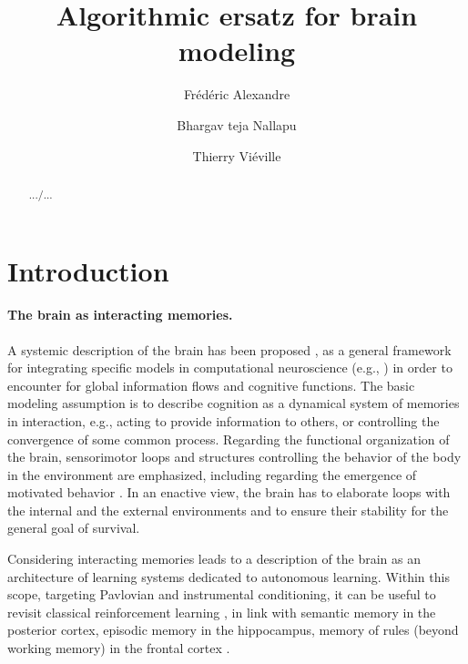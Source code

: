 \documentclass[a4,12pt]{article}
\newif\ifRR
\begin{document}
\ifRR
\makeRR 
\else
\title{Algorithmic ersatz for brain modeling}
\author[1]{Fr\'ed\'eric Alexandre}
\author[1]{Bhargav teja Nallapu}
\author[1]{Thierry Vi\'eville}
\maketitle
\begin{abstract}.../...\end{abstract}
\fi

\iffalse

\section{Introduction}

\paragraph{The brain as interacting memories.}

A systemic description of the brain has been proposed \cite{alexandre:hal-01246653}, as a general framework for integrating specific models in computational neuroscience (e.g., \cite{gershman2010context,koechlin2007information,balleine2006parallel,carrere:hal-01145790}) in order to encounter for global information flows and cognitive functions. The basic modeling assumption is to describe cognition as a dynamical system of memories in interaction, e.g., acting to provide information to others, or controlling the convergence of some common process. Regarding the functional organization of the brain, sensorimotor loops and structures controlling the behavior of the body in the environment are emphasized, including regarding the emergence of motivated behavior \cite{cardinal2002emotion,windridge2017emergent}. In an enactive view, the brain has to elaborate loops with the internal and the external environments and to ensure their stability for the general goal of survival.
 
Considering interacting memories leads to a description of the brain as an architecture of learning systems dedicated to autonomous learning. Within this scope, targeting Pavlovian and instrumental conditioning, it can be useful to revisit classical reinforcement learning \cite{redish2007reconciling}, in link with semantic memory in the posterior cortex, episodic memory in the hippocampus, memory of rules (beyond working memory) in the frontal cortex \cite{domenech2015executive,OReilly2014GoalDrivenCI}.
\end{document}
